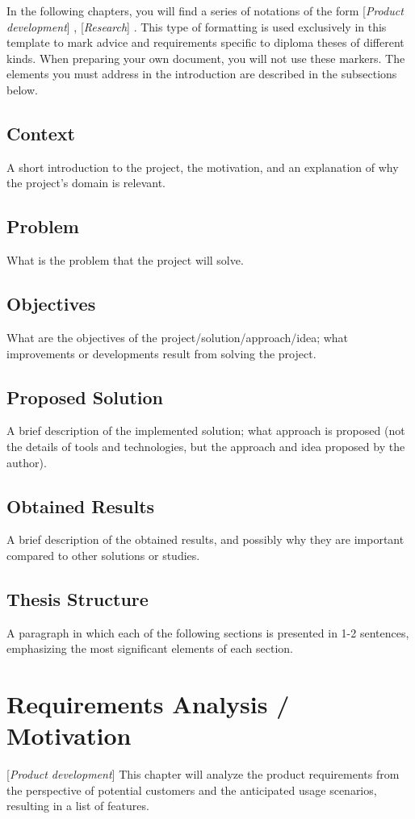 \documentclass[12pt,a4paper]{report}
\newcommand{\worktype}[1]{[\textit{#1}] }
\newcommand{\dezvoltare}{\worktype{Product development}}
\newcommand{\cercetare}{\worktype{Research}}
\begin{document}
In the following chapters, you will find a series of notations of the form \dezvoltare, \cercetare. This type of formatting is used exclusively in this template to mark advice and requirements specific to diploma theses of different kinds. When preparing your own document, you will not use these markers.
The elements you must address in the introduction are described in the subsections below.
\section{Context}
A short introduction to the project, the motivation, and an explanation of why the project's domain is relevant.
\section{Problem}
What is the problem that the project will solve.
\section{Objectives}
What are the objectives of the project/solution/approach/idea; what improvements or developments result from solving the project.
\section{Proposed Solution}
A brief description of the implemented solution; what approach is proposed (not the details of tools and technologies, but the approach and idea proposed by the author).
\section{Obtained Results}
A brief description of the obtained results, and possibly why they are important compared to other solutions or studies.
\section{Thesis Structure}
A paragraph in which each of the following sections is presented in 1-2 sentences, emphasizing the most significant elements of each section.



\chapter{Requirements Analysis / Motivation}
\dezvoltare This chapter will analyze the product requirements from the perspective of potential customers and the anticipated usage scenarios, resulting in a list of features.
\end{document}
